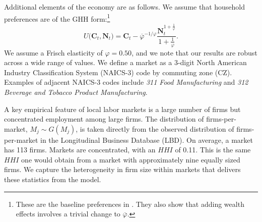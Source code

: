 \documentclass[12pt]{article}
\theoremstyle{prop}
\begin{document}
Additional elements of the economy are as follows.
We assume that household preferences are of the GHH form:\footnote{These are the baseline preferences in . They also show that adding wealth effects involves a trivial change to $\overline{\varphi}$.}
   $$ U \big(\mathbf{C}_t,\mathbf{N}_t\big)
  =  \mathbf{C}_t  - \overline{\varphi}^{-1/\varphi}\frac{\mathbf{N}_t^{1+\frac{1}{\varphi}}}{1+\frac{1}{\varphi}}. $$
We assume a Frisch elasticity of $\varphi=0.50$, and we note that our results are robust across a wide range of values. 
We define a market as a 3-digit North American Industry Classification System  (NAICS-3)  code  by commuting zone (CZ).
Examples of adjacent NAICS-3 codes include \textit{311 Food Manufacturing} and \textit{312 Beverage and Tobacco Product Manufacturing}.

A key empirical feature of local labor markets is a large number of firms but concentrated employment among large firms. 
The distribution of firms-per-market, $M_j	\sim G(M_j)$, is taken directly from the observed distribution of firms-per-market in the Longitudinal Business Database (LBD).
On average, a market has 113 firms.
Markets are concentrated, with an $HHI$ of 0.11.
This is the same $HHI$ one would obtain from a market with approximately nine equally sized firms. 
We capture the heterogeneity in firm size within markets that delivers these statistics from the model.
\end{document}
